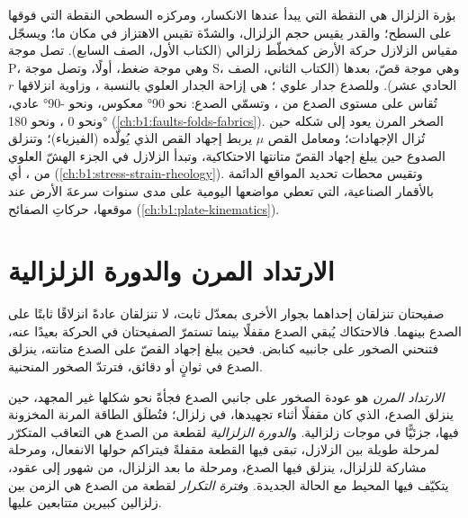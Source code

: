 \begin{recall}
بؤرة الزلزال هي النقطة التي يبدأ عندها الانكسار، ومركزه السطحي النقطة التي فوقها على السطح؛ والقدر يقيس حجم الزلزال، والشدّة تقيس الاهتزاز في مكان ما؛ ويسجّل مقياس الزلازل حركة الأرض كمخطّط زلزالي (الكتاب الأول، الصف السابع).
تصل موجة P، وهي موجة ضغط، أولًا، وتصل موجة S، وهي موجة قصّ، بعدها (الكتاب الثاني، الصف الحادي عشر). وللصدع جدار علوي ؛  هي إزاحة الجدار العلوي بالنسبة ، وزاوية انزلاقها $r$ تُقاس على مستوى الصدع من ، وتسمّي  الصدع: نحو \ang{90} معكوس، ونحو \ang{-90} عادي، ونحو 0 ، ونحو \ang{180}  (\cref{ch:b1:faults-folds-fabrics}).
الصخر المرن يعود إلى شكله حين تُزال الإجهادات؛ ومعامل القص $\mu$ يربط إجهاد القص  الذي يُولّده (الفيزياء)؛ وتنزلق الصدوع حين يبلغ إجهاد القصّ متانتها الاحتكاكية، وتبدأ الزلازل في الجزء الهشّ العلوي من ، أي  (\cref{ch:b1:stress-strain-rheology}). وتقيس محطات تحديد المواقع الدائمة بالأقمار الصناعية، التي تعطي مواضعها اليومية على مدى سنوات سرعةَ الأرض عند موقعها، حركاتِ الصفائح (\cref{ch:b1:plate-kinematics}).
\end{recall}

\section{الارتداد المرن والدورة الزلزالية}\label{sec:b1:earthquake-source:cycle}

صفيحتان تنزلقان إحداهما بجوار الأخرى بمعدّل ثابت، لا تنزلقان عادةً انزلاقًا ثابتًا على الصدع بينهما. فالاحتكاك يُبقي الصدع مقفلًا بينما تستمرّ الصفيحتان في الحركة بعيدًا عنه، فتنحني الصخور على جانبيه كنابض. فحين يبلغ إجهاد القصّ على الصدع متانته، ينزلق الصدع في ثوانٍ أو دقائق، فترتدّ الصخور المنحنية.

\begin{definition}\label{def:b1:earthquake-source:seismic-cycle}
\emph{الارتداد المرن} هو عودة الصخور على جانبي الصدع فجأةً نحو شكلها غير المجهد، حين ينزلق الصدع، الذي كان مقفلًا أثناء تجهيدها، في زلزال؛ فتُطلَق الطاقة المرنة المخزونة فيها، جزئيًّا في موجات زلزالية. و\emph{الدورة الزلزالية} لقطعة من الصدع هي التعاقب المتكرّر لمرحلة طويلة بين الزلازل، تبقى فيها القطعة مقفلةً فيتراكم حولها الانفعال، ومرحلة مشاركة للزلزال، ينزلق فيها الصدع، ومرحلة ما بعد الزلزال، من شهور إلى عقود، يتكيّف فيها المحيط مع الحالة الجديدة. و\emph{فترة التكرار} لقطعة من الصدع هي الزمن بين زلزالين كبيرين متتابعين عليها.
\end{definition}

